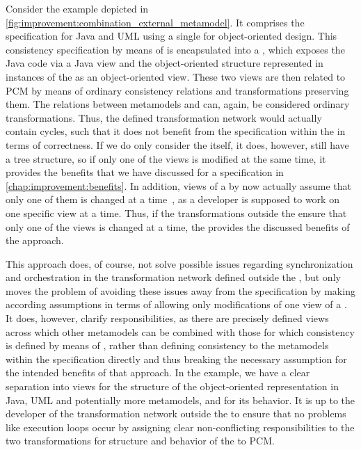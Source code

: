Consider the example depicted in \autoref{fig:improvement:combination_external_metamodel}.
It comprises the \commonalities specification for Java and \gls{UML} using a single \conceptmetamodel for object-oriented design.
This consistency specification by means of \commonalities is encapsulated into a \vsum, which exposes the Java code via a Java view and the object-oriented structure represented in instances of the \conceptmetamodel as an object-oriented view.
These two views are then related to \gls{PCM} by means of ordinary consistency relations and transformations preserving them.
The relations between metamodels and \viewtypes can, again, be considered ordinary transformations.
Thus, the defined transformation network would actually contain cycles, such that it does not benefit from the \commonalities specification within the \vsum in terms of correctness.
If we do only consider the \vsum itself, it does, however, still have a tree structure, so if only one of the views is modified at the same time, it provides the benefits that we have discussed for a \commonalities specification in \autoref{chap:improvement:benefits}.
In addition, views of a \vsum by now actually assume that only one of them is changed at a time~\cite{klare2020Vitruv-JSS}, as a developer is supposed to work on one specific view at a time.
Thus, if the transformations outside the \vsum ensure that only one of the views is changed at a time, the \vsum provides the discussed benefits of the \commonalities approach.

This approach does, of course, not solve possible issues regarding synchronization and orchestration in the transformation network defined outside the \vsum, but only moves the problem of avoiding these issues away from the \commonalities specification by making according assumptions in terms of allowing only modifications of one view of a \vsum.
It does, however, clarify responsibilities, as there are precisely defined views across which other metamodels can be combined with those for which consistency is defined by means of \commonalities, rather than defining consistency to the metamodels within the \commonalities specification directly and thus breaking the necessary assumption for the intended benefits of that approach.
In the example, we have a clear separation into views for the structure of the object-oriented representation in Java, \gls{UML} and potentially more metamodels, and for its behavior.
It is up to the developer of the transformation network outside the \vsum to ensure that no problems like execution loops occur by assigning clear non-conflicting responsibilities to the two transformations for structure and behavior of the \vsum to \gls{PCM}.

